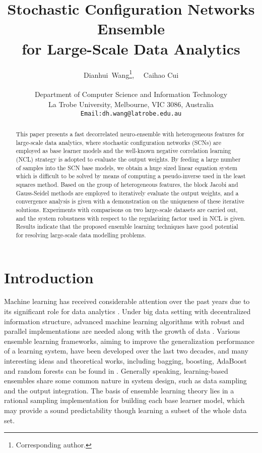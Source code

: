 \documentclass{article}
\title{Stochastic Configuration Networks Ensemble\\ for Large-Scale Data Analytics}
\author{
  Dianhui~Wang\thanks{Corresponding author.}, ~~Caihao Cui \\ \\
  Department of Computer Science and Information Technology\\ 
  La Trobe University, 
  Melbourne, VIC 3086, Australia \\
  \texttt{Email:dh.wang@latrobe.edu.au}
}
\begin{document}
\maketitle
\begin{abstract}
This paper presents a fast decorrelated neuro-ensemble with heterogeneous features for large-scale data analytics, where stochastic configuration networks (SCNs) are employed as base learner models and the well-known negative correlation learning (NCL) strategy is adopted to evaluate the output weights.
By feeding a large number of samples into the SCN base models, we obtain a huge sized linear equation system which is difficult to be solved by means of computing a pseudo-inverse used in the least squares method.
Based on the group of heterogeneous features, the block Jacobi and Gauss-Seidel methods are employed to iteratively evaluate the output weights, and a convergence analysis is given with a demonstration on the uniqueness of these iterative solutions.
Experiments with comparisons on two large-scale datasets are carried out,
and the system robustness with respect to the regularizing factor used in NCL is given.
Results indicate that the proposed ensemble learning techniques have good potential for resolving large-scale data modelling problems.  
\end{abstract}

\section{Introduction}
Machine learning has received considerable attention over the past years due to its significant role for data analytics \cite{jordan2015machine}.  
Under big data setting with decentralized information structure, advanced machine learning algorithms with robust and parallel implementations are needed along with the growth of data \cite{scardapane2015distributed, scardapane2016decentralized}.  
Various ensemble learning frameworks, aiming to improve the generalization performance of a learning system, have been developed over the last two decades, and many interesting ideas and theoretical works, including bagging, boosting, AdaBoost and random forests
can be found in \cite{alhamdoosh2014fast, breiman1996bagging, breiman2001random, brown2005managing, chen2009regularized, cui2016high, geman1992neural, hansen1990neural, igelnik1999ensemble, li2015multisource, liu1999ensemble, polikar2012ensemble, rosen1996ensemble, schapire1990strength}.
Generally speaking, learning-based ensembles share some common nature in system design, such as data sampling and the output integration. 
The basis of ensemble learning theory lies in a rational sampling implementation for building each base learner model, which may provide a sound predictability though learning a subset of the whole data set.
\end{document}
